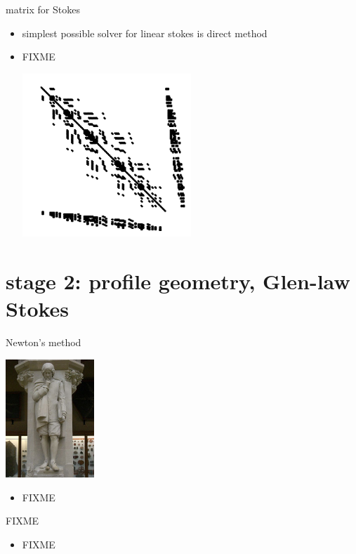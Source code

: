 \documentclass[10pt,hyperref,dvipsnames]{beamer}
\begin{document}
\begin{frame}{matrix for Stokes}

\begin{itemize}
\item simplest possible solver for linear stokes is direct method
\item FIXME
\begin{center}
\includegraphics[width=0.5\textwidth]{figs/Kstokes.pdf}
\end{center}
\end{itemize}
\end{frame}


\section{stage 2: profile geometry, Glen-law Stokes}

\begin{frame}{Newton's method}

\hfill \includegraphics[width=0.25\textwidth]{figs/inewton.jpg}

\vspace{-20mm}
\begin{itemize}
\item FIXME
\end{itemize}
\end{frame}


\begin{frame}{FIXME}

\begin{itemize}
\item FIXME
\end{itemize}
\end{frame}
\end{document}
